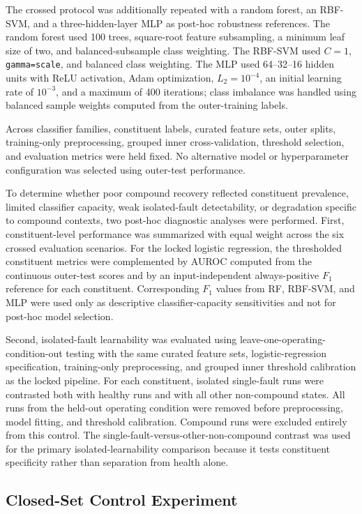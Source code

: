 \documentclass{ieeeaccess}
\begin{document}
The crossed protocol was additionally repeated with a random forest, an
RBF-SVM, and a three-hidden-layer MLP as post-hoc robustness references.
The random forest used 100 trees, square-root feature subsampling, a minimum
leaf size of two, and balanced-subsample class weighting. The RBF-SVM used
$C=1$, \texttt{gamma=scale}, and balanced class weighting. The MLP used 64--32--16 hidden units with ReLU activation, Adam optimization,
$L_2=10^{-4}$, an initial learning rate of $10^{-3}$, and a maximum of 400 iterations; class imbalance was handled using balanced sample weights computed from the outer-training labels.

Across classifier families, constituent labels, curated feature sets, outer
splits, training-only preprocessing, grouped inner cross-validation,
threshold selection, and evaluation metrics were held fixed. No alternative
model or hyperparameter configuration was selected using outer-test
performance.

To determine whether poor compound recovery reflected constituent prevalence,
limited classifier capacity, weak isolated-fault detectability, or degradation
specific to compound contexts, two post-hoc diagnostic analyses were
performed. First, constituent-level performance was summarized with equal
weight across the six crossed evaluation scenarios. For the locked logistic regression, the thresholded constituent metrics were
complemented by AUROC computed from the continuous outer-test scores and by
an input-independent always-positive $F_1$ reference for each constituent.
Corresponding $F_1$ values from RF, RBF-SVM, and MLP were used only as
descriptive classifier-capacity sensitivities and not for post-hoc model
selection.

Second, isolated-fault learnability was evaluated using
leave-one-operating-condition-out testing with the same curated feature sets,
logistic-regression specification, training-only preprocessing, and grouped
inner threshold calibration as the locked pipeline. For each constituent,
isolated single-fault runs were contrasted both with healthy runs and with all
other non-compound states. All runs from the held-out operating condition were
removed before preprocessing, model fitting, and threshold calibration.
Compound runs were excluded entirely from this control. The
single-fault-versus-other-non-compound contrast was used for the primary
isolated-learnability comparison because it tests constituent specificity
rather than separation from health alone.
\subsection{Closed-Set Control Experiment}
\label{subsec:closed_set_control}
\end{document}
